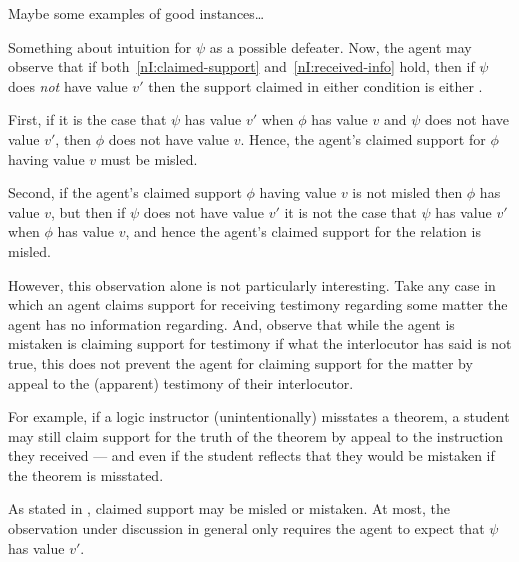 \begin{note}
  \color{red}
  Maybe some examples of good instances…
\end{note}

\begin{note}
  {
    \color{red}
    Something about intuition for \(\psi\) as a possible defeater.
  }
  Now, the agent may observe that if both~\ref{nI:claimed-support} and~\ref{nI:received-info} hold, then if \(\psi\) does \emph{not} have value \(v'\) then the support claimed in either condition is either \mom{}.

  First, if it is the case that \(\psi\) has value \(v'\) when \(\phi\) has value \(v\) and \(\psi\) does not have value \(v'\), then \(\phi\) does not have value \(v\).
  Hence, the agent's claimed support for \(\phi\) having value \(v\) must be misled.

  Second, if the agent's claimed support \(\phi\) having value \(v\) is not misled then \(\phi\) has value \(v\), but then if \(\psi\) does not have value \(v'\) it is not the case that \(\psi\) has value \(v'\) when \(\phi\) has value \(v\), and hence the agent's claimed support for the relation is misled.

  However, this observation alone is not particularly interesting.
  Take any case in which an agent claims support for receiving testimony regarding some matter the agent has no information regarding.
  And, observe that while the agent is mistaken is claiming support for testimony if what the interlocutor has said is not true, this does not prevent the agent for claiming support for the matter by appeal to the (apparent) testimony of their interlocutor.

  For example, if a logic instructor (unintentionally) misstates a theorem, a student may still claim support for the truth of the theorem by appeal to the instruction they received --- and even if the student reflects that they would be mistaken if the theorem is misstated.

  As stated in \eiS{}, claimed support may be misled or mistaken.
  At most, the observation under discussion in general only requires the agent to expect that \(\psi\) has value \(v'\).

\end{note}

